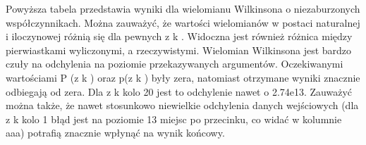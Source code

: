 \documentclass[8pt,letterpaper]{article}
\begin{document}
\hspace{1.0 cm}Powyższa tabela przedstawia wyniki dla wielomianu Wilkinsona o niezaburzonych współczynnikach.
Można zauważyć, że wartości wielomianów w postaci naturalnej i iloczynowej różnią się dla pewnych
z k . Widoczna jest również różnica między pierwiastkami wyliczonymi, a rzeczywistymi. Wielomian
Wilkinsona jest bardzo czuły na odchylenia na poziomie przekazywanych argumentów. Oczekiwanymi
wartościami P (z k ) oraz p(z k ) były zera, natomiast otrzymane wyniki znacznie odbiegają od zera. Dla z k kolo 20 jest to odchylenie nawet o 2.74e13. Zauważyć można także, że nawet stosunkowo niewielkie odchylenia danych wejściowych (dla z k kolo 1 błąd jest na poziomie 13 miejsc po przecinku, co widać w kolumnie aaa) potrafią znacznie wpłynąć na wynik końcowy.

\begin{center}
\begin{tabular}{|c|c|c|c|}
                       

\end{tabular}
\end{center}
\end{document}
